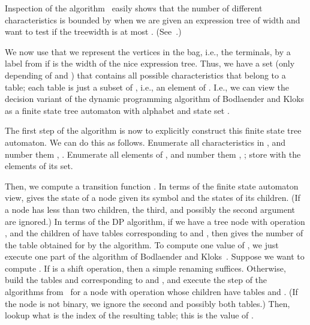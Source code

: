 \documentclass[a4paper,11pt]{article}
\theoremstyle{definition}
\theoremstyle{remark}
\begin{document}
Inspection of the algorithm~\cite{BodlaenderK96} easily shows that the
number of different characteristics is bounded by  when we are given an expression tree of width  and
want to test if the treewidth is at most .  (See~\cite[Definition
5.9]{BodlaenderK96}.)

We now use that we represent the vertices in the bag, i.e., the
terminals, by a label from  if  is the
width of the nice expression tree.  Thus, we have a set 
(only depending of  and ) that contains all possible
characteristics that belong to a table; each table is just a subset of
, i.e., an element of .  I.e., we
can view the decision variant of the dynamic programming algorithm of
Bodlaender and Kloks as a finite state tree automaton with alphabet
 and state set .

The first step of the algorithm is now to explicitly construct this
finite state tree automaton.  We can do this as follows.  Enumerate
all characteristics in , and number them , .  Enumerate all elements of
, and number them , ; store with  the elements of its set.

Then, we compute a transition function .  In
terms of the finite state automaton view,  gives the state of a
node given its symbol and the states of its children.  (If a node has
less than two children, the third, and possibly the second argument
are ignored.) In terms of the DP algorithm, if we have a tree node 
with operation , and the children of  have tables
corresponding to  and , then 
gives the number of the table obtained for  by the algorithm.  To
compute one value of , we just execute one part of the algorithm of
Bodlaender and Kloks~\cite{BodlaenderK96}.  Suppose we want to compute
.  If  is a shift operation, then a simple
renaming suffices.  Otherwise, build the tables  and
 corresponding to  and , and execute the
step of the algorithms from~\cite{BodlaenderK96} for a node with
operation  whose children have tables  and .
(If the node is not binary, we ignore the second and possibly both
tables.)  Then, lookup what is the index of the resulting table; this
is the value of .
\end{document}
